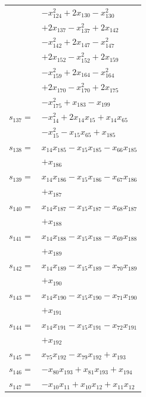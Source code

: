 \begin{longtable}{@{}r@{\;}l@{}}
 & \(\displaystyle -x_{124}^{2} +2x_{130} -x_{130}^{2}\) \\
 & \(\displaystyle +2x_{137} -x_{137}^{2} +2x_{142}\) \\
 & \(\displaystyle -x_{142}^{2} +2x_{147} -x_{147}^{2}\) \\
 & \(\displaystyle +2x_{152} -x_{152}^{2} +2x_{159}\) \\
 & \(\displaystyle -x_{159}^{2} +2x_{164} -x_{164}^{2}\) \\
 & \(\displaystyle +2x_{170} -x_{170}^{2} +2x_{175}\) \\
 & \(\displaystyle -x_{175}^{2} +x_{183} -x_{199}\) \\[3pt]
\(s_{137}=\) & \(\displaystyle -x_{14}^{2} +2x_{14}x_{15} +x_{14}x_{65}\) \\
 & \(\displaystyle -x_{15}^{2} -x_{15}x_{65} +x_{185}\) \\[3pt]
\(s_{138}=\) & \(\displaystyle x_{14}x_{185} -x_{15}x_{185} -x_{66}x_{185}\) \\
 & \(\displaystyle +x_{186}\) \\[3pt]
\(s_{139}=\) & \(\displaystyle x_{14}x_{186} -x_{15}x_{186} -x_{67}x_{186}\) \\
 & \(\displaystyle +x_{187}\) \\[3pt]
\(s_{140}=\) & \(\displaystyle x_{14}x_{187} -x_{15}x_{187} -x_{68}x_{187}\) \\
 & \(\displaystyle +x_{188}\) \\[3pt]
\(s_{141}=\) & \(\displaystyle x_{14}x_{188} -x_{15}x_{188} -x_{69}x_{188}\) \\
 & \(\displaystyle +x_{189}\) \\[3pt]
\(s_{142}=\) & \(\displaystyle x_{14}x_{189} -x_{15}x_{189} -x_{70}x_{189}\) \\
 & \(\displaystyle +x_{190}\) \\[3pt]
\(s_{143}=\) & \(\displaystyle x_{14}x_{190} -x_{15}x_{190} -x_{71}x_{190}\) \\
 & \(\displaystyle +x_{191}\) \\[3pt]
\(s_{144}=\) & \(\displaystyle x_{14}x_{191} -x_{15}x_{191} -x_{72}x_{191}\) \\
 & \(\displaystyle +x_{192}\) \\[3pt]
\(s_{145}=\) & \(\displaystyle x_{75}x_{192} -x_{79}x_{192} +x_{193}\) \\[3pt]
\(s_{146}=\) & \(\displaystyle -x_{80}x_{193} +x_{81}x_{193} +x_{194}\) \\[3pt]
\(s_{147}=\) & \(\displaystyle -x_{10}x_{11} +x_{10}x_{12} +x_{11}x_{12}\) \\

\end{longtable}
